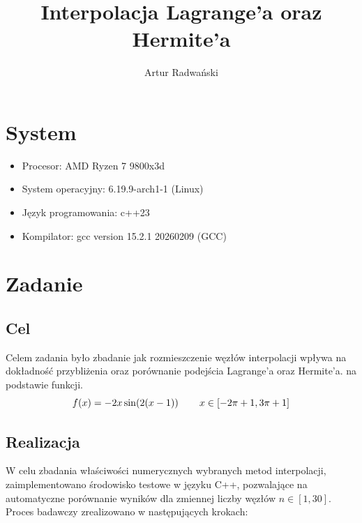 \documentclass{article}
\author{Artur Radwański}
\title{Interpolacja Lagrange'a oraz Hermite'a}
\begin{document}
\maketitle


\linespread{1.3}
\selectfont

\section{System}
\begin{itemize}
    \item Procesor: AMD Ryzen 7 9800x3d
    \item System operacyjny: 6.19.9-arch1-1 (Linux)
    \item Język programowania: c++23
    \item Kompilator: gcc version 15.2.1 20260209 (GCC) 
\end{itemize}


\section{Zadanie}
\subsection{Cel}
Celem zadania było zbadanie jak rozmieszczenie węzłów interpolacji wpływa na dokładność przybliżenia oraz porównanie podejścia Lagrange'a oraz Hermite'a.
na podstawie funkcji.
\[f(x) = -2x\sin(2(x-1))\hspace{5ex}  x\in[-2\pi+1,3\pi+1]\]


\subsection{Realizacja}

W celu zbadania właściwości numerycznych wybranych metod interpolacji, zaimplementowano środowisko testowe w języku C++, pozwalające na automatyczne porównanie wyników dla zmiennej liczby węzłów $n \in [1, 30]$. Proces badawczy zrealizowano w następujących krokach:
\end{document}

